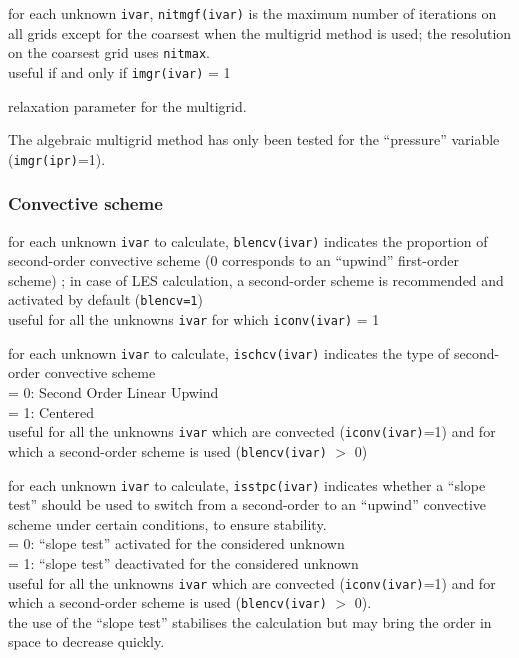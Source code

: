 {for each unknown {\tt ivar}, {\tt nitmgf(ivar)} is the maximum number of
iterations on all grids except for the coarsest when the multigrid method is
used; the resolution on the coarsest grid uses {\tt nitmax}.\\
useful if and only if {\tt imgr(ivar)} = 1}

{relaxation parameter for the multigrid.
}

The algebraic multigrid method has only been tested for
the ``pressure'' variable ({\tt imgr(ipr)}=1).

\subsubsection{Convective scheme}

{for each unknown {\tt ivar} to calculate, {\tt blencv(ivar)} indicates the
 proportion of second-order convective scheme (0 corresponds to an
``upwind'' first-order scheme) ; in case of LES calculation, a
second-order scheme is recommended and activated by default ({\tt blencv=1})\\
useful for all the unknowns {\tt ivar} for which {\tt iconv(ivar)} = 1}

{for each unknown {\tt ivar} to calculate, {\tt ischcv(ivar)} indicates the type of second-order
convective scheme\\
\hspace*{1.3cm}= 0: Second Order Linear Upwind\\
\hspace*{1.3cm}= 1: Centered\\
useful for all the unknowns {\tt ivar} which are convected
({\tt iconv(ivar)}=1) and
for which a second-order scheme is used ({\tt blencv(ivar)} $>$ 0)}

{for each unknown {\tt ivar} to calculate, {\tt isstpc(ivar)}
indicates whether a ``slope test'' should
be used to switch from a second-order to an ``upwind'' convective
scheme under certain conditions, to ensure stability.\\
\hspace*{1.3cm}= 0: ``slope test'' activated for the considered unknown\\
\hspace*{1.3cm}= 1: ``slope test'' deactivated for the considered unknown\\
useful for all the unknowns {\tt ivar}  which are convected
({\tt iconv(ivar)}=1) and
for which a second-order scheme is used ({\tt blencv(ivar)} $>$ 0).\\
the use of the ``slope test'' stabilises the calculation but may bring
the order in space to decrease quickly.}

